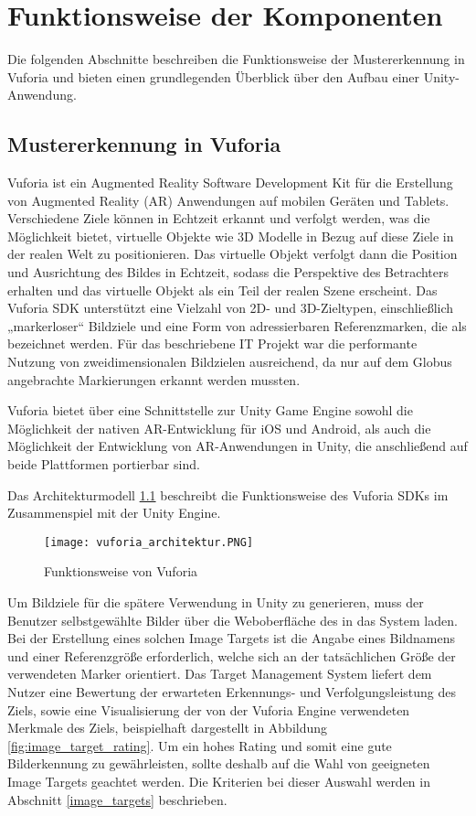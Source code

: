 \chapter{Funktionsweise der Komponenten}\label{ch:funktionsweise_der_komponenten}
Die folgenden Abschnitte beschreiben die Funktionsweise der Mustererkennung in Vuforia und bieten einen grundlegenden Überblick über den Aufbau einer Unity-Anwendung.
\section{Mustererkennung in Vuforia}
Vuforia ist ein Augmented Reality Software Development Kit für die Erstellung von Augmented Reality (AR) Anwendungen auf mobilen Geräten und Tablets.
Verschiedene Ziele können in Echtzeit erkannt und verfolgt werden, was die Möglichkeit bietet, virtuelle Objekte wie 3D Modelle in Bezug auf diese Ziele in der realen Welt zu positionieren.
Das virtuelle Objekt verfolgt dann die Position und Ausrichtung des Bildes in Echtzeit, sodass die Perspektive des Betrachters erhalten und das virtuelle Objekt als ein Teil der realen Szene erscheint.
Das Vuforia SDK unterstützt eine Vielzahl von 2D- und 3D-Zieltypen, einschließlich „markerloser“ Bildziele und eine Form von adressierbaren Referenzmarken, die als  bezeichnet werden. 
Für das beschriebene IT Projekt war die performante Nutzung von zweidimensionalen Bildzielen ausreichend, da nur auf dem Globus angebrachte Markierungen erkannt werden mussten.

Vuforia bietet über eine Schnittstelle zur Unity Game Engine sowohl die Möglichkeit der nativen AR-Entwicklung für iOS und Android, als auch die Möglichkeit der Entwicklung von AR-Anwendungen in Unity, die anschließend auf beide Plattformen portierbar sind.

Das Architekturmodell \ref{fig:vuforia_architektur} beschreibt die Funktionsweise des Vuforia SDKs im Zusammenspiel mit der Unity Engine.

\begin{figure} [h]
\centering
\texttt{[image: vuforia\_architektur.PNG]}
\caption{Funktionsweise von Vuforia}
\label{fig:vuforia_architektur}
\end{figure}
 
Um Bildziele für die spätere Verwendung in Unity zu generieren, muss der Benutzer selbstgewählte Bilder über die Weboberfläche des  in das System laden.
Bei der Erstellung eines solchen Image Targets ist die Angabe eines Bildnamens und einer Referenzgröße erforderlich, welche sich an der tatsächlichen Größe der verwendeten Marker orientiert.
Das Target Management System liefert dem Nutzer eine Bewertung der erwarteten Erkennungs- und Verfolgungsleistung des Ziels, sowie eine Visualisierung der von der Vuforia Engine verwendeten Merkmale des Ziels, beispielhaft dargestellt in Abbildung \ref{fig:image_target_rating}.
Um ein hohes Rating und somit eine gute Bilderkennung zu gewährleisten, sollte deshalb auf die Wahl von geeigneten Image Targets geachtet werden.
Die Kriterien bei dieser Auswahl werden in Abschnitt \ref{image_targets} beschrieben.


